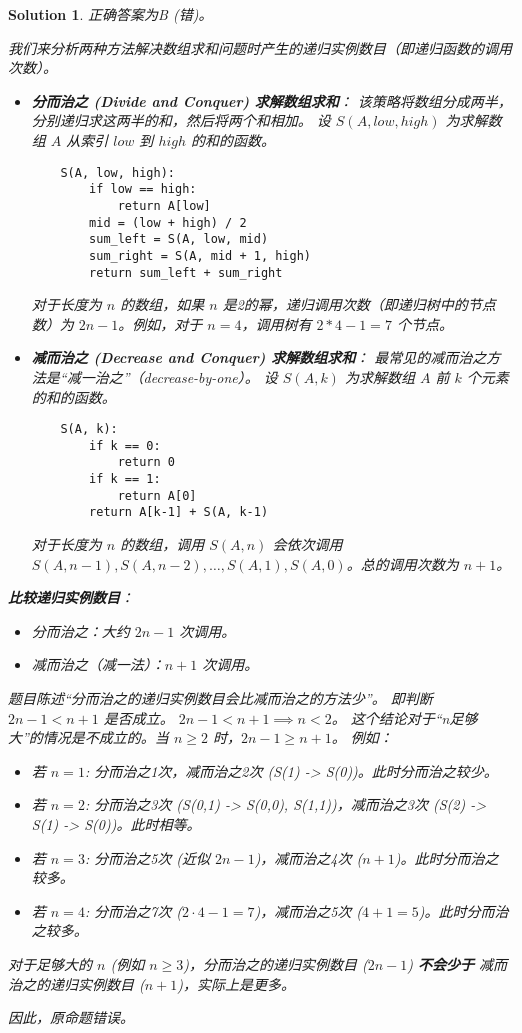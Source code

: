 \documentclass[UTF8]{report}
\newtheorem{solution}{Solution}
\theoremstyle{MyLineTheoremStyle} %
\theoremstyle{MyBlockTheoremStyle} %
\theoremstyle{MySubsubsectionStyle} %
\begin{document}
\begin{solution}
正确答案为B (错)。

我们来分析两种方法解决数组求和问题时产生的递归实例数目（即递归函数的调用次数）。

\begin{itemize}
    \item \textbf{分而治之 (Divide and Conquer) 求解数组求和}：
    该策略将数组分成两半，分别递归求这两半的和，然后将两个和相加。
    设 $S(A, low, high)$ 为求解数组 $A$ 从索引 $low$ 到 $high$ 的和的函数。
    \begin{verbatim}
    S(A, low, high):
        if low == high:
            return A[low]
        mid = (low + high) / 2
        sum_left = S(A, low, mid)
        sum_right = S(A, mid + 1, high)
        return sum_left + sum_right
    \end{verbatim}
    对于长度为 $n$ 的数组，如果 $n$ 是2的幂，递归调用次数（即递归树中的节点数）为 $2n-1$。例如，对于 $n=4$，调用树有 $2*4-1=7$ 个节点。

    \item \textbf{减而治之 (Decrease and Conquer) 求解数组求和}：
    最常见的减而治之方法是“减一治之”（decrease-by-one）。
    设 $S(A, k)$ 为求解数组 $A$ 前 $k$ 个元素的和的函数。
    \begin{verbatim}
    S(A, k):
        if k == 0:
            return 0
        if k == 1:
            return A[0]
        return A[k-1] + S(A, k-1)
    \end{verbatim}
    对于长度为 $n$ 的数组，调用 $S(A,n)$ 会依次调用 $S(A,n-1), S(A,n-2), \dots, S(A,1), S(A,0)$。总的调用次数为 $n+1$。
\end{itemize}

\textbf{比较递归实例数目}：
\begin{itemize}
    \item 分而治之：大约 $2n-1$ 次调用。
    \item 减而治之（减一法）：$n+1$ 次调用。
\end{itemize}
题目陈述“分而治之的递归实例数目会比减而治之的方法少”。
即判断 $2n-1 < n+1$ 是否成立。
$2n-1 < n+1 \implies n < 2$。
这个结论对于“n足够大”的情况是不成立的。当 $n \ge 2$ 时，$2n-1 \ge n+1$。
例如：
\begin{itemize}
    \item 若 $n=1$: 分而治之1次，减而治之2次 (S(1) -> S(0))。此时分而治之较少。
    \item 若 $n=2$: 分而治之3次 (S(0,1) -> S(0,0), S(1,1))，减而治之3次 (S(2) -> S(1) -> S(0))。此时相等。
    \item 若 $n=3$: 分而治之5次 (近似 $2n-1$)，减而治之4次 ($n+1$)。此时分而治之较多。
    \item 若 $n=4$: 分而治之7次 ($2 \cdot 4 - 1 = 7$)，减而治之5次 ($4+1=5$)。此时分而治之较多。
\end{itemize}
对于足够大的 $n$ (例如 $n \ge 3$)，分而治之的递归实例数目 ($2n-1$) \textbf{不会少于} 减而治之的递归实例数目 ($n+1$)，实际上是更多。

因此，原命题错误。
\end{solution}
\end{document}
